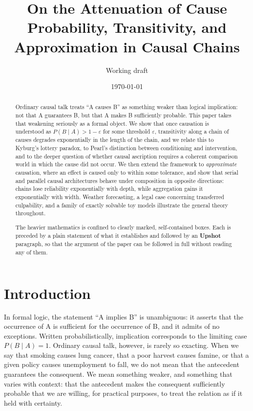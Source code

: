 \documentclass[11pt]{article}
\title{\textbf{On the Attenuation of Cause}\\[4pt]
\large Probability, Transitivity, and Approximation in Causal Chains}
\author{Working draft}
\date{\today}
\theoremstyle{definition}
\newcommand{\eps}{\varepsilon}
\begin{document}
\maketitle

\begin{abstract}
\noindent Ordinary causal talk treats ``A causes B'' as something weaker than logical implication: not that A guarantees B, but that A makes B sufficiently probable. This paper takes that weakening seriously as a formal object. We show that once causation is understood as $P(B\mid A) > 1-\eps$ for some threshold $\eps$, transitivity along a chain of causes degrades exponentially in the length of the chain, and we relate this to Kyburg's lottery paradox, to Pearl's distinction between conditioning and intervention, and to the deeper question of whether causal ascription requires a coherent comparison world in which the cause did not occur. We then extend the framework to \emph{approximate} causation, where an effect is caused only to within some tolerance, and show that serial and parallel causal architectures behave under composition in opposite directions: chains lose reliability exponentially with depth, while aggregation gains it exponentially with width. Weather forecasting, a legal case concerning transferred culpability, and a family of exactly solvable toy models illustrate the general theory throughout.

\medskip
\noindent The heavier mathematics is confined to clearly marked, self-contained boxes. Each is preceded by a plain statement of what it establishes and followed by an \textbf{Upshot} paragraph, so that the argument of the paper can be followed in full without reading any of them.
\end{abstract}

\tableofcontents

\section{Introduction}
\label{sec:intro}

In formal logic, the statement ``A implies B'' is unambiguous: it asserts that the occurrence of A is sufficient for the occurrence of B, and it admits of no exceptions. Written probabilistically, implication corresponds to the limiting case $P(B \mid A) = 1$. Ordinary causal talk, however, is rarely so exacting. When we say that smoking causes lung cancer, that a poor harvest causes famine, or that a given policy causes unemployment to fall, we do not mean that the antecedent guarantees the consequent. We mean something weaker, and something that varies with context: that the antecedent makes the consequent sufficiently probable that we are willing, for practical purposes, to treat the relation as if it held with certainty.
\end{document}

